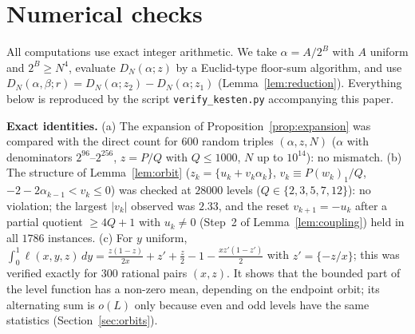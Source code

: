 \documentclass[11pt]{amsart}
\theoremstyle{definition}
\numberwithin{equation}{section}
\newcommand{\fr}[1]{\{#1\}}
\begin{document}
\section{Numerical checks}\label{sec:numerics}

All computations use exact integer arithmetic. We take $\alpha=A/2^B$ with $A$ uniform and $2^B\ge N^{4}$, evaluate $D_N(\alpha;z)$ by a
Euclid-type floor-sum algorithm, and use $D_N(\alpha,\beta;r)=D_N(\alpha;z_2)-D_N(\alpha;z_1)$ (Lemma~\ref{lem:reduction}). Everything below is
reproduced by the script \texttt{verify\_kesten.py} accompanying this paper.

\smallskip\noindent\textbf{Exact identities.} (a) The expansion of Proposition~\ref{prop:expansion} was compared with the direct count for $600$ random
triples $(\alpha,z,N)$ ($\alpha$ with denominators $2^{96}$--$2^{256}$, $z=P/Q$ with $Q\le1000$, $N$ up to $10^{14}$): no mismatch.
(b) The structure of Lemma~\ref{lem:orbit} ($z_k=\fr{u_k+v_k\alpha_k}$, $v_k\equiv P(w_k)_1/Q$, $-2-2\alpha_{k-1}<v_k\le0$) was checked at $28000$ levels
($Q\in\{2,3,5,7,12\}$): no violation; the largest $|v_k|$ observed was $2.33$, and the reset $v_{k+1}=-u_k$ after a partial quotient $\ge4Q+1$ with $u_k\ne0$
(Step~2 of Lemma~\ref{lem:coupling}) held in all $1786$ instances. (c) For $y$ uniform, $\int_0^1\ell(x,y,z)\,dy=\frac{z(1-z)}{2x}+z'+\frac z2-1-\frac{xz'(1-z')}2$
with $z'=\fr{-z/x}$; this was verified exactly for $300$ rational pairs $(x,z)$. It shows that the bounded part of the level function has a non-zero
mean, depending on the endpoint orbit; its alternating sum is $o(L)$ only because even and odd levels have the same statistics (Section~\ref{sec:orbits}).
\end{document}
